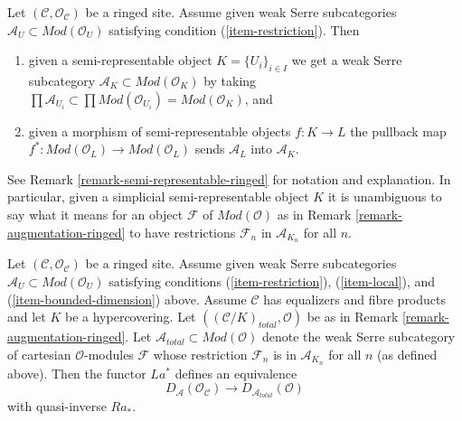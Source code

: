 \noindent
Let $(\mathcal{C}, \mathcal{O}_\mathcal{C})$ be a ringed site.
Assume given weak Serre subcategories
$\mathcal{A}_U \subset \textit{Mod}(\mathcal{O}_U)$
satisfying condition (\ref{item-restriction}).
Then
\begin{enumerate}
\item given a semi-representable object $K = \{U_i\}_{i \in I}$
we get a weak Serre subcategory
$\mathcal{A}_K \subset \textit{Mod}(\mathcal{O}_K)$
by taking $\prod \mathcal{A}_{U_i} \subset 
\prod \textit{Mod}(\mathcal{O}_{U_i}) = \textit{Mod}(\mathcal{O}_K)$, and
\item given a morphism of semi-representable objects
$f : K \to L$ the pullback map
$f^* : \textit{Mod}(\mathcal{O}_L) \to \textit{Mod}(\mathcal{O}_L)$
sends $\mathcal{A}_L$ into $\mathcal{A}_K$.
\end{enumerate}
See Remark \ref{remark-semi-representable-ringed} for notation and
explanation. In particular, given a simplicial semi-representable object $K$
it is unambiguous to say what it means for an object $\mathcal{F}$ of
$\textit{Mod}(\mathcal{O})$ as in Remark \ref{remark-augmentation-ringed}
to have restrictions $\mathcal{F}_n$ in
$\mathcal{A}_{K_n}$ for all $n$.

\begin{lemma}
\label{lemma-hypercovering-equivalence-modules}
Let $(\mathcal{C}, \mathcal{O}_\mathcal{C})$ be a ringed site.
Assume given weak Serre subcategories
$\mathcal{A}_U \subset \textit{Mod}(\mathcal{O}_U)$
satisfying conditions (\ref{item-restriction}),
(\ref{item-local}), and (\ref{item-bounded-dimension}) above.
Assume $\mathcal{C}$ has equalizers and fibre products and
let $K$ be a hypercovering.
Let $((\mathcal{C}/K)_{total}, \mathcal{O})$ be as in
Remark \ref{remark-augmentation-ringed}.
Let $\mathcal{A}_{total} \subset \textit{Mod}(\mathcal{O})$
denote the weak Serre subcategory of cartesian $\mathcal{O}$-modules
$\mathcal{F}$ whose restriction $\mathcal{F}_n$ is in
$\mathcal{A}_{K_n}$ for all $n$ (as defined above).
Then the functor $La^*$ defines an equivalence
$$
D_\mathcal{A}(\mathcal{O}_\mathcal{C})
\longrightarrow
D_{\mathcal{A}_{total}}(\mathcal{O})
$$
with quasi-inverse $Ra_*$.
\end{lemma}

